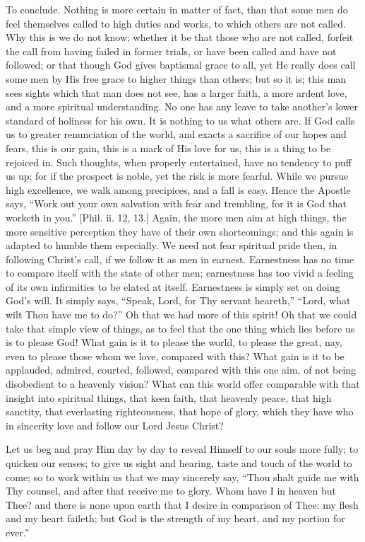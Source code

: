 To conclude. Nothing is more certain in matter of fact, than that
some men do feel themselves called to high duties and works, to which
others are not called. Why this is we do not know; whether it be that
those who are not called, forfeit the call from having failed in
former trials, or have been called and have not followed; or that
though God gives baptismal grace to all, yet He really does call some
men by His free grace to higher things than others; but so it is; this
man sees sights which that man does not see, has a larger faith, a
more ardent love, and a more spiritual understanding. No one has any
leave to take another's lower standard of holiness for his own. It is
nothing to us what others are. If God calls us to greater renunciation
of the world, and exacts a sacrifice of our hopes and fears, this is
our gain, this is a mark of His love for us, this is a thing to be
rejoiced in. Such thoughts, when properly entertained, have no
tendency to puff us up; for if the prospect is noble, yet the risk is
more fearful. While we pursue high excellence, we walk among
precipices, and a fall is easy. Hence the Apostle says, ``Work out
your own salvation with fear and trembling, for it is God that worketh
in you.'' [Phil. ii. 12, 13.] Again, the more men aim at high
things, the more sensitive perception they have of their own
shortcomings; and this again is adapted to humble them especially. We
need not fear spiritual pride then, in following Christ's call, if we
follow it as men in earnest. Earnestness has no time to compare itself
with the state of other men; earnestness has too vivid a feeling of
its own infirmities to be elated at itself. Earnestness is simply set
on doing God's will. It simply says, ``Speak, Lord, for Thy
servant heareth,'' ``Lord, what wilt Thou have me to do?''
Oh that we had more of this spirit! Oh that we could take that simple
view of things, as to feel that the one thing which lies before us is
to please God! What gain is it to please the world, to please the
great, nay, even to please those whom we love, compared with this?
What gain is it to be applauded, admired, courted, followed, compared
with this one aim, of not being disobedient to a heavenly vision? What
can this world offer comparable with that insight into spiritual
things, that keen faith, that heavenly peace, that high sanctity, that
everlasting righteousness, that hope of glory, which they have who in
sincerity love and follow our Lord Jesus Christ?

Let us beg and pray Him day by day to reveal Himself to our souls
more fully; to quicken our senses; to give us sight and hearing, taste
and touch of the world to come; so to work within us that we may
sincerely say, ``Thou shalt guide me with Thy counsel, and after
that receive me to glory. Whom have I in heaven but Thee? and there is
none upon earth that I desire in comparison of Thee: my flesh and my
heart faileth; but God is the strength of my heart, and my portion for
ever.''

